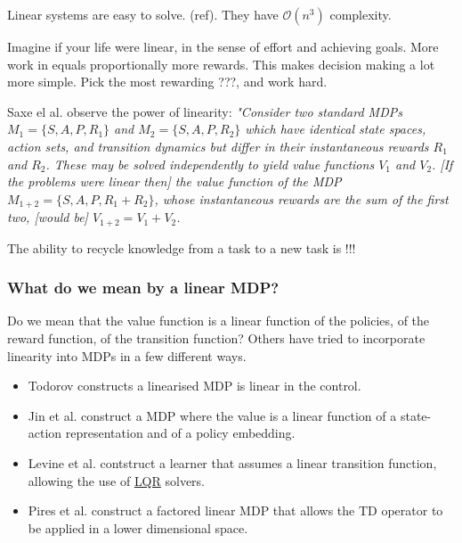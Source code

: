 
Linear systems are easy to solve. (ref). They have $\mathcal O(n^3)$ complexity.

Imagine if your life were linear, in the sense of effort and achieving goals.
More work in equals proportionally more rewards. This makes decision making
a lot more simple. Pick the most rewarding ???, and work hard.

Saxe el al. observe the power of linearity: \textit{"Consider two standard MDPs
$M_1 = \{S, A, P, R_1\}$ and $M_2 = \{S, A, P, R_2\}$ which have
identical state spaces, action sets, and transition dynamics but differ in their
instantaneous rewards $R_1$ and $R_2$. These may be solved independently to
yield value functions $V_1$ and $V_2$. [If the problems were linear then] the value function of the MDP
$M_{1+2} = \{S, A, P, R_1 +R_2\}$, whose instantaneous rewards are the sum of the
first two, [would be] $V_{1+2} = V_1 + V_2$.} \cite{Saxea}

The ability to recycle knowledge from a task to a new task is !!!




\subsubsection{What do we mean by a linear MDP?}

Do we mean that the value function is a linear function of the policies,
of the reward function, of the transition function? Others have tried to incorporate
linearity into MDPs in a few different ways.

\begin{itemize}
  \tightlist
  \item Todorov constructs a linearised MDP is linear in the control. \cite{Todorov2006}
  \item Jin et al. construct a MDP where the value is a linear function of a state-action representation and of a policy embedding. \cite{Wang}
  \item Levine et al. contstruct a learner that assumes a linear transition function, allowing the use of \href{https://en.wikipedia.org/wiki/Linear%E2%80%93quadratic_regulator}{LQR} solvers.\cite{Levine2019}
  \item Pires et al. construct a factored linear MDP that allows the TD operator to be applied in a lower dimensional space. \cite{Pires2016}
\end{itemize}

